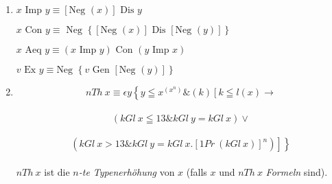 \documentclass[draft]{scrartcl}
\begin{document}
\begin{enumerate}[1.]
	$Sb\left(x\substack{v\\y}\right)$ ist der oben definierte Begriff $Subst\ a\left(\substack{v\\b}\right)$\footnote{Statt $Sb\left[Sb\left(x\substack{v\\y}\right)\substack{w\\z}\right]$ schreiben wir: $Sb\left(x\substack{v\ u\\y\ z}\right)$ (analog für mehr als zwei Variable).}.

	\item {}$x \text{ Imp } y \equiv \left[\text{Neg }\left(x\right)\right] \text{ Dis } y $

	$x \text{ Con } y \equiv \text{ Neg } \left\{\left[\text{Neg }\left(x\right)\right]\text{ Dis }\left[\text{Neg }\left(y\right)\right]\right\}$

	$x \text{ Aeq } y \equiv \left(x \text{ Imp } y\right) \text{ Con } \left(y \text { Imp } x\right)$%

	$v \text { Ex } y \equiv \text{Neg } \left\{v \text{ Gen } \left[\text{Neg } \left(y\right)\right]\right\}$%

	\item {} $$
		n Th\ x \equiv \epsilon y \left\{ y \leqq x^{\left(x^n\right)} \& \left(k\right) \left[k \leqq l\left(x\right) \longrightarrow \right.\right.
	$$\\[\spacebetweenbreakedequations]
	$$
		\left.\left.\left(k Gl\ x \leqq 13 \& k Gl\ y = k Gl\ x\right) \lor\right.\right.
	$$\\[\spacebetweenbreakedequations]
	$$
		\left.\left.\left(k Gl\ x > 13 \& k Gl\ y = k Gl\ x.\left[1 Pr\ \left(k Gl\  x\right)\right]^n\right)\right]\right\}
	$$\\[\spaceafterbreakedequation]

	$n Th\ x$ ist die \textit{$n$-te Typenerhöhung} von $x$ (falls $x$ und $n Th\ x$ \textit{Formeln} sind).


\end{enumerate}
\end{document}
